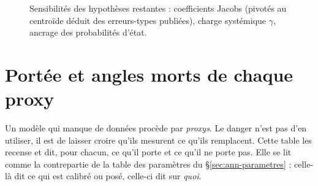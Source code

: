 \begin{figure}[htbp]\centering
{}
\caption{Sensibilités des hypothèses restantes : coefficients Jacobs (pivotés au centroïde
déduit des erreurs-types publiées), charge systémique $\gamma$, ancrage des probabilités
d'état.}
\label{fig:hypotheses}
\end{figure}

\section{Portée et angles morts de chaque proxy}
\label{sec:ann-proxys}

%

\noindent Un modèle qui manque de données procède par \emph{proxys}. Le danger n'est pas d'en
utiliser, il est de laisser croire qu'ils mesurent ce qu'ils remplacent. Cette table les recense
et dit, pour chacun, ce qu'il porte et ce qu'il ne porte pas. Elle se lit comme la contrepartie de
la table des paramètres du \S\ref{sec:ann-parametres} : celle-là dit ce qui est calibré ou posé,
celle-ci dit sur \emph{quoi}.

